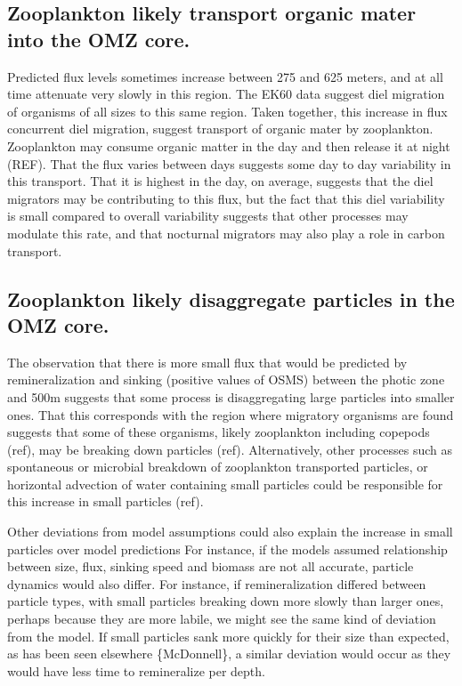 \documentclass[]{article}
\begin{document}
\hypertarget{zooplankton-likely-transport-organic-mater-into-the-omz-core.}{%
\subsection{Zooplankton likely transport organic mater into the OMZ
core.}\label{zooplankton-likely-transport-organic-mater-into-the-omz-core.}}

Predicted flux levels sometimes increase between 275 and 625 meters, and
at all time attenuate very slowly in this region. The EK60 data suggest
diel migration of organisms of all sizes to this same region. Taken
together, this increase in flux concurrent diel migration, suggest
transport of organic mater by zooplankton. Zooplankton may consume
organic matter in the day and then release it at night (REF). That the
flux varies between days suggests some day to day variability in this
transport. That it is highest in the day, on average, suggests that the
diel migrators may be contributing to this flux, but the fact that this
diel variability is small compared to overall variability suggests that
other processes may modulate this rate, and that nocturnal migrators may
also play a role in carbon transport.

\hypertarget{zooplankton-likely-disaggregate-particles-in-the-omz-core.}{%
\subsection{Zooplankton likely disaggregate particles in the OMZ
core.}\label{zooplankton-likely-disaggregate-particles-in-the-omz-core.}}

The observation that there is more small flux that would be predicted by
remineralization and sinking (positive values of OSMS) between the
photic zone and 500m suggests that some process is disaggregating large
particles into smaller ones. That this corresponds with the region where
migratory organisms are found suggests that some of these organisms,
likely zooplankton including copepods (ref), may be breaking down
particles (ref). Alternatively, other processes such as spontaneous or
microbial breakdown of zooplankton transported particles, or horizontal
advection of water containing small particles could be responsible for
this increase in small particles (ref).

Other deviations from model assumptions could also explain the increase
in small particles over model predictions For instance, if the models
assumed relationship between size, flux, sinking speed and biomass are
not all accurate, particle dynamics would also differ. For instance, if
remineralization differed between particle types, with small particles
breaking down more slowly than larger ones, perhaps because they are
more labile, we might see the same kind of deviation from the model. If
small particles sank more quickly for their size than expected, as has
been seen elsewhere \{McDonnell\}, a similar deviation would occur as
they would have less time to remineralize per depth.
\end{document}
